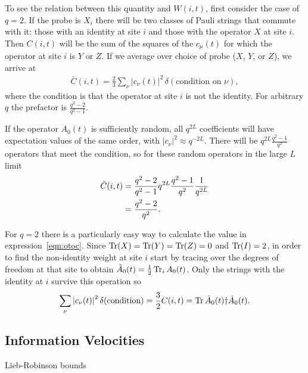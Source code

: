 To see the relation between this quantity and $W(i,t)$, first consider the case of $q=2$. If the probe is $X_i$ there will be two classes of Pauli strings that commute with it: those with an identity at site $i$ and those with the operator $X$ at site $i$. Then $C(i,t)$ will be the sum of the squares of the $c_\mu(t)$ for which the operator at site $i$ is $Y$ or $Z$. If we average over choice of probe ($X$, $Y$, or $Z$), we arrive at 
\begin{align}
\bar{C}(i,t) = \frac{2}{3}\sum_\nu|c_\nu(t)|^2\,\delta(\text{condition 
	on $\nu$}),\label{eqn:otoc}
\end{align}
where the condition is that the operator at site $i$ is not the identity. For arbitrary $q$ the prefactor is $\frac{q^2-2}{q^2-1}$. 

If the operator $A_0(t)$ is sufficiently random, all $q^{2L}$ coefficients will have expectation values of the same order, with $|c_\nu|^2 \approx q^{-2L}$. There will be $q^{2L}\frac{q^2-1}{q^2}$ operators that meet the condition, so for these random operators in the large $L$ limit
\begin{align}
\bar{C}(i,t) &= \frac{q^2-2}{q^2-1}q^{2L}\frac{q^2-1}{q^2}\frac{1}{q^{2L}}\nonumber\\
&= \frac{q^2-2}{q^2}\nonumber.
\end{align}

For $q=2$ there is a particularly easy way to calculate the value in expression~\ref{eqn:otoc}. Since $\operatorname{Tr}(X) = \operatorname{Tr}(Y)=\operatorname{Tr}(Z) = 0$ and $\operatorname{Tr}(I) = 2$, in order to find the non-identity weight at site $i$ start by tracing over the degrees of freedom at that site to obtain $\tilde{A}_0(t) = \frac{1}{2}\operatorname{Tr}_iA_0(t)$. Only the strings with the identity at $i$ survive this operation so
\begin{align}
\sum_\nu \left|c_\nu(t)\right|^2\delta(\text{condition}) = \frac{3}{2}C(i,t) =  \operatorname{Tr} 
	\tilde{A}_0(t)\dag\tilde{A}_0(t).
\end{align}

\subsection{Information Velocities} \label{sub:vels}

Lieb-Robinson bounds

